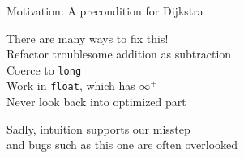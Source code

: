 \documentclass[usenames, xcolor=dvipsnames]{beamer}
\begin{document}
\begin{frame}{Motivation: A precondition for Dijkstra}

There are many ways to fix this!
\\ \hspace{1em} Refactor troublesome addition as subtraction
\\ \hspace{1em} Coerce to \texttt{long}
\\ \hspace{1em} Work in \texttt{float}, which has $\infty^{+}$
\\ \hspace{1em} Never look back into optimized part

\bigskip

\pause Sadly, intuition supports our misstep \\
and bugs such as this one are often overlooked

\end{frame}
\end{document}

